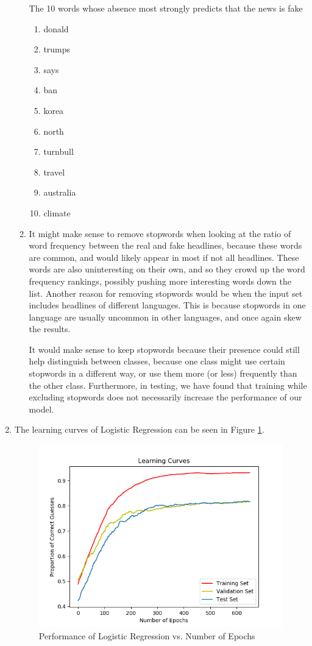 \documentclass[10pt,letterpaper]{article}
\begin{document}
\begin{enumerate}
\begin{enumerate}
			The 10 words whose absence most strongly predicts that the news is fake
			\begin{enumerate}
				\item donald
				\item trumps
				\item says
				\item ban
				\item korea
				\item north
				\item turnbull
				\item travel
				\item australia
				\item climate
			\end{enumerate}
			\item %
			It might make sense to remove stopwords when looking at the ratio of word frequency between the real and fake headlines, because these words are common, and would likely appear in most if not all headlines.
			These words are also uninteresting on their own, and so they crowd up the word frequency rankings, possibly pushing more interesting words down the list.
			Another reason for removing stopwords would be when the input set includes headlines of different languages.
			This is because stopwords in one language are usually uncommon in other languages, and once again skew the results.

			It would make sense to keep stopwords because their presence could still help distinguish between classes, because one class might use certain stopwords in a different way, or use them more (or less) frequently than the other class.
			Furthermore, in testing, we have found that training while excluding stopwords does not necessarily increase the performance of our model.

		\end{enumerate}
	\item %
	The learning curves of Logistic Regression can be seen in Figure \ref{fig:part4learningcurve}.
	\begin{figure}[H]
		\centering
		\includegraphics[width=\linewidth]{Part4LearningCurve}
		\caption{Performance of Logistic Regression vs. Number of Epochs}
		\label{fig:part4learningcurve}
	\end{figure}


\end{enumerate}
\end{document}
